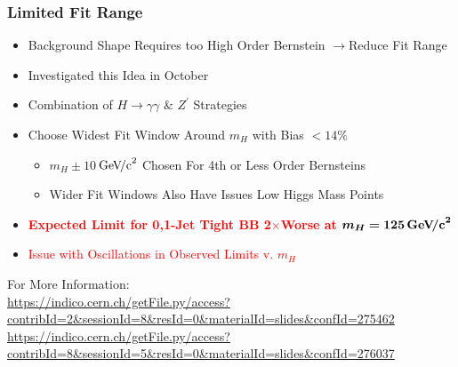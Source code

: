 \documentclass{beamer}
\newcommand{\jra}{\ensuremath{\rightarrow}}
\newcommand{\GeVcc}{\ensuremath{\,\mathrm{Ge\kern -0.1em V\!/c}^2}}
\newcommand{\tred}[1]{\textcolor{red}{#1}}
\newcommand{\tredbf}[1]{\textcolor{red}{\bf #1}}
\begin{document}
\begin{frame}
\frametitle{Limited Fit Range}
  \begin{itemize}
    \item Background Shape Requires too High Order Bernstein \jra Reduce Fit Range
    \item Investigated this Idea in October
    \item Combination of $H\rightarrow\gamma\gamma$ \& $Z^\prime$ Strategies
    \item Choose Widest Fit Window Around $m_H$ with Bias $<14\%$
    \begin{itemize}
      \item $m_H\pm10$\GeVcc{} Chosen For 4th or Less Order Bernsteins
      \item Wider Fit Windows Also Have Issues Low Higgs Mass Points
    \end{itemize}
    \item \tredbf{Expected Limit for 0,1-Jet Tight BB 2$\times$Worse at $\bm{m_H=125\GeVcc{}}$}
    \item \tred{Issue with Oscillations in Observed Limits v. $m_H$}
  \end{itemize}
\begin{center}
For More Information:
\tiny
\\ \vspace{1ex}
\textcolor{blue}{\url{https://indico.cern.ch/getFile.py/access?contribId=2\&sessionId=8\&resId=0\&materialId=slides\&confId=275462}}
\\ \vspace{1ex}
\textcolor{blue}{\url{https://indico.cern.ch/getFile.py/access?contribId=8\&sessionId=5\&resId=0\&materialId=slides\&confId=276037}}
\end{center}
\end{frame}
\end{document}
